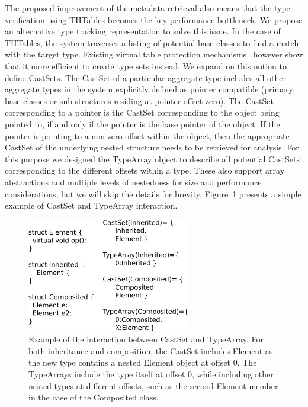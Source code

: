The proposed improvement of the metadata retrieval also means that the
type verification using THTables becomes the key performance bottleneck.
We propose an alternative type tracking representation to solve this issue.
In the case of THTables, the system traverses a listing of potential base classes to
find a match with the target type. Existing virtual table protection mechanisms~\cite{tice2014enforcing}
however show that it more efficient to create type sets instead. 
We expand on this notion to define CastSets. The CastSet of a particular aggregate
type includes all other aggregate types in the system explicitly defined as pointer compatible
(primary base classes or sub-structures residing at pointer offset zero). The CastSet corresponding to a
pointer is the CastSet corresponding to the object being pointed to, if and only if the pointer
is the base pointer of the object. If the pointer is pointing to a non-zero offset within the object,
then the appropriate CastSet of the underlying nested structure needs to be
retrieved for analysis. For this purpose we designed the TypeArray object to
describe all potential CastSets corresponding
to the different offsets within a type. These also support array abstractions and multiple levels
of nestedness for size and performance considerations, but we will skip the details for brevity.
Figure~\ref{fig:typeexample} presents a simple example of CastSet and TypeArray interaction.

\begin{figure}[t]
\center
  \includegraphics[width=2.8in]{figs/typeexample.eps}
  \caption{
  Example of the interaction between CastSet and TypeArray. For both inheritance and composition,
  the CastSet includes Element as the new type contains a nested Element object at offset 0. The
  TypeArrays include the type itself at offset 0,
  while including other nested types at different offsets, such as the second Element member in the case of the
  Composited class.
  }
  \label{fig:typeexample}
  \vspace{-1em}
\end{figure}

